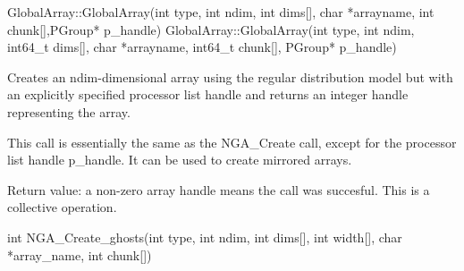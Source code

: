 \documentclass[12pt]{article}
\begin{document}
\begin{cxxapi}
\begin{cxxcode}
GlobalArray::GlobalArray(int type, int ndim, int dims[], char *arrayname,
                         int chunk[],PGroup* p_handle)
GlobalArray::GlobalArray(int type, int ndim, int64_t dims[], char *arrayname,
                         int64_t chunk[], PGroup* p_handle)
\end{cxxcode}
\begin{funcargs}
\end{funcargs}
\end{cxxapi}

\dcoll

\begin{desc}

  Creates an ndim-dimensional array using the regular distribution
  model but with an explicitly specified processor list handle and
  returns an integer handle representing the array.

  This call is essentially the same as the NGA_Create call, except for
  the processor list handle p_handle. It can be used to create
  mirrored arrays.

  Return value: a non-zero array handle means the call was succesful.
  This is a collective operation.

\end{desc}


\begin{capi}
\begin{ccode}
int NGA_Create_ghosts(int type, int ndim, int dims[], int width[],
                      char *array_name, int chunk[])
\end{ccode}
\begin{funcargs}
\end{funcargs}
\end{capi}
\end{document}
